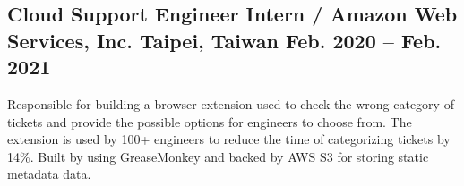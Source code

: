 \subsection{{Cloud Support Engineer Intern / Amazon Web Services, Inc. \hfill Taipei, Taiwan \> Feb. 2020 -- Feb. 2021}}

\begin{zitemize}
\item Responsible for building a browser extension used to check the wrong category of tickets and provide the possible options for engineers to choose from. The extension is used by 100+ engineers to reduce the time of categorizing tickets by 14\%. Built by using GreaseMonkey and backed by AWS S3 for storing static metadata data.
\end{zitemize}

